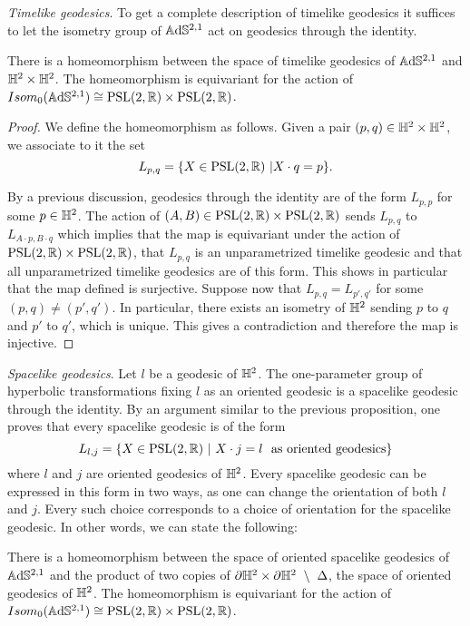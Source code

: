\noindent\textit{Timelike geodesics}.
To get a complete description of timelike geodesics it suffices to let the isometry group of $\mathbb{A}\mathrm{d}\mathbb{S}^{2,1}$ act on geodesics through the identity.
\begin{proposition}
    There is a homeomorphism between the space of timelike geodesics of $\mathbb{A}\mathrm{d}\mathbb{S}^{2,1}$ and $\mathbb{H}^2 \times \mathbb{H}^2$.
    The homeomorphism is equivariant for the action of $Isom_0(\mathbb{A}\mathrm{d}\mathbb{S}^{2,1}) \cong \text{PSL}(2,\mathbb{R}) \times \text{PSL}(2,\mathbb{R})$.
\end{proposition}
\begin{proof}
    We define the homeomorphism as follows. Given a pair $(p,q) \in \mathbb{H}^2\times\mathbb{H}^2$, we associate to it the set
    \[
        L_{p,q} = \{X \in \text{PSL}(2,\mathbb{R}) \ | X \cdot q = p\}.
    \]
    
    By a previous discussion, geodesics through the identity are of the form $L_{p,p}$ for some $p\in\mathbb{H}^2$. The action of $(A,B) \in \text{PSL}(2,\mathbb{R}) \times \text{PSL}(2,\mathbb{R})$ sends $L_{p,q}$ to $L_{A\cdot p, B\cdot q}$ which implies that the map is equivariant under the action of $\text{PSL}(2,\mathbb{R})\times\text{PSL}(2,\mathbb{R})$, that $L_{p,q}$ is an unparametrized timelike geodesic and that all unparametrized timelike geodesics are of this form. This shows in particular that the map defined is surjective.
    Suppose now that $L_{p,q} = L_{p',q'}$ for some $(p,q) \neq (p',q')$. In particular, there exists an isometry of $\mathbb{H}^2$ sending $p$ to $q$ and $p'$ to $q'$, which is unique. This gives a contradiction and therefore the map is injective.
\end{proof}

\noindent\textit{Spacelike geodesics}.
Let $l$ be a geodesic of $\mathbb{H}^2$. The one-parameter group of hyperbolic transformations fixing $l$ as an oriented geodesic is a spacelike geodesic through the identity. By an argument similar to the previous proposition, one proves that every spacelike geodesic is of the form
\[
    L_{l,j} = \{ X \in\text{PSL}(2,\mathbb{R}) \ | \ X \cdot j = l \ \ \text{as oriented geodesics} \}
\]
where $l$ and $j$ are oriented geodesics of $\mathbb{H}^2$. Every spacelike geodesic can be expressed in this form in two ways, as one can change the orientation of both $l$ and $j$. Every such choice corresponds to a choice of orientation for the spacelike geodesic. In other words, we can state the following:
\begin{proposition}
    There is a homeomorphism between the space of oriented spacelike geodesics of $\mathbb{A}\mathrm{d}\mathbb{S}^{2,1}$ and the product of two copies of $\partial \mathbb{H}^2 \times \partial \mathbb{H}^2 \ \setminus \ \Delta$, the space of oriented geodesics of $\mathbb{H}^2$. 
    The homeomorphism is equivariant for the action of $Isom_0(\mathbb{A}\mathrm{d}\mathbb{S}^{2,1}) \cong \text{PSL}(2,\mathbb{R}) \times \text{PSL}(2,\mathbb{R})$.
\end{proposition}

